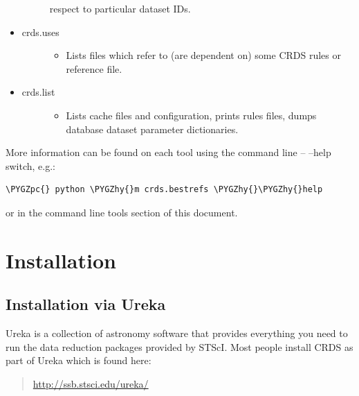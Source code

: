 \documentclass[letterpaper,10pt,english]{sphinxmanual}
\def\PYGZpc{\char`\%}
\def\PYGZhy{\char`\-}
\begin{document}
\begin{itemize}
\begin{description}
\begin{itemize}
\end{itemize}

respect to particular dataset IDs.

\end{description}

\item {} \begin{description}
\item[{crds.uses}] \leavevmode\begin{itemize}
\item {} 
Lists files which refer to (are dependent on) some CRDS rules or reference file.

\end{itemize}

\end{description}

\item {} \begin{description}
\item[{crds.list}] \leavevmode\begin{itemize}
\item {} 
Lists cache files and configuration,  prints rules files,  dumps database dataset parameter dictionaries.

\end{itemize}

\end{description}

\end{itemize}

More information can be found on each tool using the command line -- --help switch,  e.g.:

\begin{Verbatim}[commandchars=\\\{\}]
\PYGZpc{} python \PYGZhy{}m crds.bestrefs \PYGZhy{}\PYGZhy{}help
\end{Verbatim}

or in the command line tools section of this document.


\chapter{Installation}
\label{installation:installation}

\section{Installation via Ureka}
\label{installation:installation-via-ureka}
Ureka is a collection of astronomy software that provides everything you need to run the data reduction packages
provided by STScI.   Most people install CRDS as part of Ureka which is found here:
\begin{quote}

\href{http://ssb.stsci.edu/ureka/}{http://ssb.stsci.edu/ureka/}
\end{quote}
\end{document}
